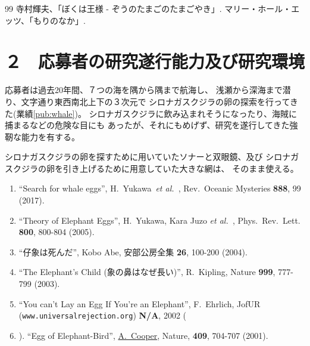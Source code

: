 \documentclass[11pt,a4j,dvipdfmx]{jarticle} 					%
\newcommand{\研究課題名}{象の卵}
\newcommand{\研究機関名}{逢坂大学}
\newcommand{\研究代表者氏名}{湯川秀樹}
\newcommand{\研究期間の最終元号年度}{12}  %
\newcommand{\paper}[6]{%
	\item ``#1'', #2, #3 {\bf #4}, #5 (#6).			%
}
\newcommand{\etal}{\textit{et al.\ }}
\newcommand{\yukawa}{H.~Yukawa}					%
\newcommand{\prl}{Phys.\ Rev.\ Lett.\ }		%
\begin{document}
\vspace*{1zw}
\begin{thebibliography}{99}
	 寺村輝夫、「ぼくは王様 - ぞうのたまごのたまごやき」.
	 マリー・ホール・エッツ、「もりのなか」.
\end{thebibliography}




\section{２　応募者の研究遂行能力及び研究環境}

\PapersInstructions		%
	応募者は過去20年間、７つの海を隅から隅まで航海し、
	浅瀬から深海まで潜り、文字通り東西南北上下の３次元で
	シロナガスクジラの卵の探索を行ってきた(業績\ref{pub:whale})。		%
	シロナガスクジラに飲み込まれそうになったり、海賊に捕まるなどの危険な目にも
	あったが、それにもめげず、研究を遂行してきた強靭な能力を有する。

	シロナガスクジラの卵を探すために用いていたソナーと双眼鏡、及び
	シロナガスクジラの卵を引き上げるために用意していた大きな網は、
	そのまま使える。
	\begin{enumerate}
		\paper{Search for whale eggs}{\yukawa\ \etal}{Rev.\ Oceanic Mysteries}{888}{99}{2017}
			\label{pub:whale}
				
		\paper{Theory of Elephant Eggs}{\yukawa, Kara Juzo \etal}{\prl}{800}{800-804}{2005}
			\label{pub:theoegg}
				
		\paper{仔象は死んだ}{Kobo Abe}{安部公房全集}{26}{100-200}{2004}
		
		\paper{The Elephant's Child (象の鼻はなぜ長い)}{R.~Kipling}{Nature}{999}{777-799}{2003}

		\paper{You can't Lay an Egg If You're an Elephant}{F.~Ehrlich}
			{JofUR\\({\tt www.universalrejection.org})}{{\bf N/A}}{2002}
		
		\item ``Egg of Elephant-Bird'', 
				\underline{A.~Cooper},
				Nature, {\bf 409}, 704-707 (2001).	%
	\end{enumerate}
\end{document}
